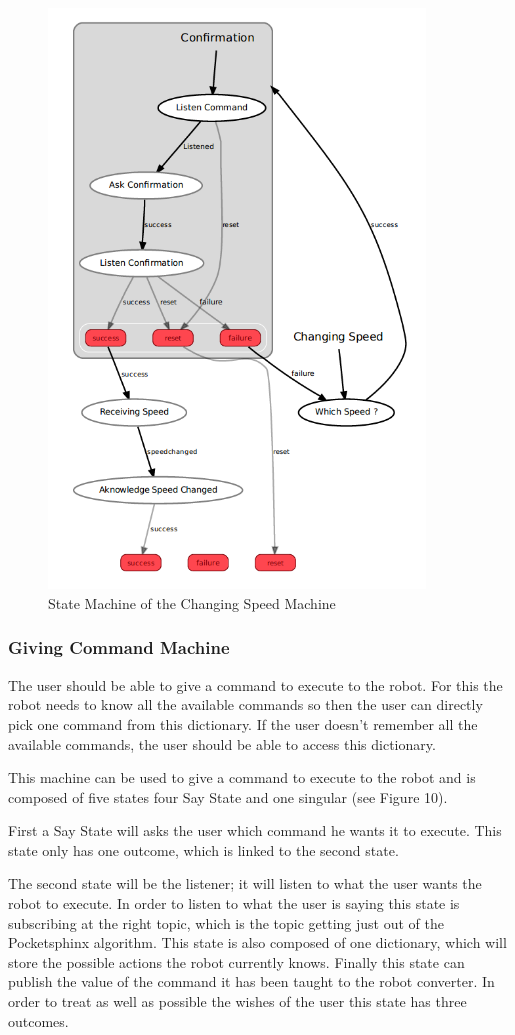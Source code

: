 \begin{figure}
 \center
 \includegraphics[width=10cm]{img_SM/ChangingSpeedBranch.png}
 \caption{State Machine of the Changing Speed Machine}
 \end{figure}

\subsubsection{Giving Command Machine}
The user should be able to give a command to execute to the robot. For this the robot needs to know all the available commands so then the user can directly pick one command from this dictionary. If the user doesn't remember all the available commands, the user should be able to access this dictionary.

This machine can be used to give a command to execute to the robot and is composed of five states four Say State and one singular (see Figure 10).

First a Say State will asks the user which command he wants it to execute. This state only has one outcome, which is linked to the second state.

The second state will be the listener; it will listen to what the user wants the robot to execute. In order to listen to what the user is saying this state is subscribing at the right topic, which is the topic getting just out of the Pocketsphinx algorithm. This state is also composed of one dictionary, which will store the possible actions the robot currently knows. Finally this state can publish the value of the command it has been taught to the robot converter. In order to treat as well as possible the wishes of the user this state has three outcomes.

